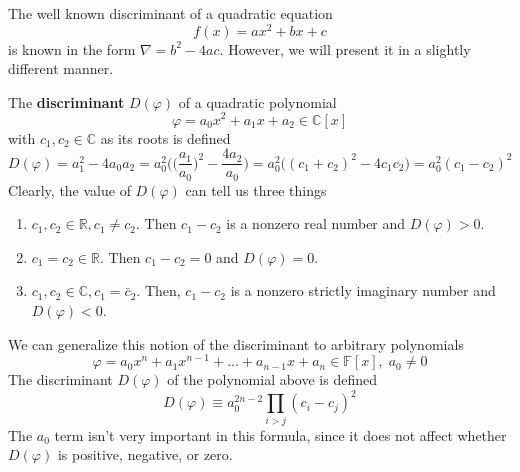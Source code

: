     The well known discriminant of a quadratic equation 
    \begin{equation}
      f(x) = ax^2 + bx + c
    \end{equation}
    is known in the form $\nabla = b^2 - 4ac$. However, we will present it in a slightly different manner. 

    \begin{definition}
      The \textbf{discriminant} $D(\varphi)$ of a quadratic polynomial
      \begin{equation}
        \varphi = a_0 x^2 + a_1 x + a_2 \in \mathbb{C}[x]
      \end{equation}
      with $c_1, c_2 \in \mathbb{C}$ as its roots is defined
      \begin{equation}
        D(\varphi) = a_1^2 - 4 a_0 a_2 = a_0^2 \bigg( \Big(\frac{a_1}{a_0} \Big)^2 - \frac{4 a_2}{a_0} \bigg) = a_0^2 \big( (c_1 + c_2)^2 - 4 c_1 c_2 \big) = a_0^2 (c_1 - c_2)^2
      \end{equation}
      Clearly, the value of $D(\varphi)$ can tell us three things
      \begin{enumerate}
        \item $c_1, c_2 \in \mathbb{R}, c_1 \neq c_2$. Then $c_1 - c_2$ is a nonzero real number and $D(\varphi) > 0$. 
        \item $c_1 = c_2 \in \mathbb{R}$. Then $c_1 - c_2 = 0$ and $D(\varphi) = 0$. 
        \item $c_1, c_2 \in \mathbb{C}, c_1 = \bar{c}_2$. Then, $c_1 - c_2$ is a nonzero strictly imaginary number and $D(\varphi) < 0$. 
      \end{enumerate}
    \end{definition}

    \begin{definition}
      We can generalize this notion of the discriminant to arbitrary polynomials
      \begin{equation}
        \varphi = a_0 x^n + a_1 x^{n-1} + ... + a_{n-1} x + a_n \in \mathbb{F}[x], \; a_0 \neq 0
      \end{equation}
      The discriminant $D(\varphi)$ of the polynomial above is defined
      \begin{equation}
        D(\varphi) \equiv a_0^{2n-2} \prod_{i>j} (c_i - c_j)^2
      \end{equation}
      The $a_0$ term isn't very important in this formula, since it does not affect whether $D(\varphi)$ is positive, negative, or zero. 
    \end{definition}

